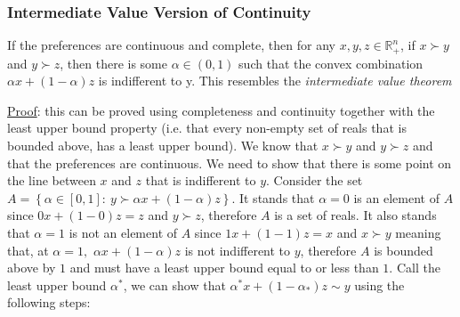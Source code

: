 \documentclass{article}
\begin{document}
\subsubsection{Intermediate Value Version of Continuity}
If the preferences are continuous and complete, then for any $x, y, z \in \mathbb{R}_{+}^{n}$, if $x \succ y$ and $y \succ z$, then there is some $\alpha \in (0,1)$ such that the convex combination $\alpha x + (1- \alpha)z$ is indifferent to y. This resembles the \textit{intermediate value theorem} \par \vspace{0.3em}
  \underline{Proof}: this can be proved using completeness and continuity together with the least upper bound property (i.e. that every non-empty set of reals that is bounded above, has a least upper bound). We know that $x \succ y$ and $y \succ z$ and that the preferences are continuous. We need to show that there is some point on the line between $x$ and $z$ that is indifferent to $y$. Consider the set $A = \left\{ \alpha \in [0,1]: \ y \succ \alpha x + (1- \alpha)z \right\}$. It stands that $\alpha = 0$ is an element of $A$ since $0x + (1 - 0)z = z$ and $y \succ z$, therefore $A$ is a set of reals. It also stands that $\alpha = 1$ is not an element of $A$ since $1x + (1-1)z = x$ and $x \succ y$ meaning that, at $\alpha = 1,$ $\alpha x + (1- \alpha)z$ is not indifferent to $y$, therefore $A$ is bounded above by $1$ and must have a least upper bound equal to or less than $1$. Call the least upper bound $\alpha^{*}$, we can show that $\alpha^{*}x + (1 - \alpha_{*})z \sim y$ using the following steps:
\end{document}
